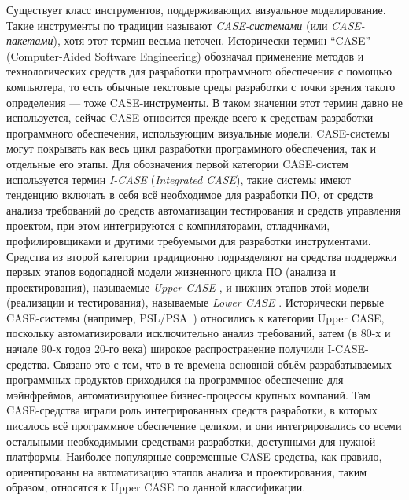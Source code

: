 Существует класс инструментов, поддерживающих визуальное моделирование. 
Такие инструменты по традиции называют \textit{CASE-системами} (или \textit{CASE-пакетами}), 
хотя этот термин весьма неточен. Исторически термин "`CASE"' 
(Computer-Aided Software Engineering) обозначал применение методов и 
технологических средств для разработки программного обеспечения с помощью 
компьютера, то есть обычные текстовые среды разработки с точки зрения такого 
определения --- тоже CASE-инструменты. В таком значении этот термин давно 
не используется, сейчас CASE относится прежде всего к средствам разработки 
программного обеспечения, использующим визуальные модели. CASE-системы могут 
покрывать как весь цикл разработки программного обеспечения, так и отдельные 
его этапы. Для обозначения первой категории CASE-систем используется термин 
\textit{I-CASE}
(\textit{Integrated CASE}), такие системы имеют тенденцию включать в себя всё 
необходимое для разработки ПО, от средств анализа требований до средств 
автоматизации тестирования и средств управления проектом, при этом интегрируются 
с компиляторами, отладчиками, профилировщиками и другими требуемыми для 
разработки инструментами. Средства из второй категории традиционно подразделяют 
на средства поддержки первых этапов водопадной модели жизненного цикла ПО 
(анализа и проектирования), называемые \textit{Upper CASE}
, и нижних этапов этой модели 
(реализации и тестирования), называемые \textit{Lower CASE}
. Исторически первые CASE-системы (например, PSL/PSA~\cite{teichroew1977psl}) относились к категории Upper CASE, поскольку 
автоматизировали исключительно анализ требований, затем 
(в 80-х и начале 90-х годов 20-го века) широкое распространение получили 
I-CASE-средства. Связано это с тем, что в те времена основной объём 
разрабатываемых программных продуктов приходился на программное обеспечение для 
мэйнфреймов, автоматизирующее бизнес-процессы крупных компаний. Там 
CASE-средства играли роль интегрированных средств разработки, в которых 
писалось всё программное обеспечение целиком, и они интегрировались со всеми 
остальными необходимыми средствами разработки, доступными для нужной платформы. 
Наиболее популярные современные CASE-средства, как правило, ориентированы на 
автоматизацию этапов анализа и проектирования, таким образом, относятся к 
Upper CASE по данной классификации.


